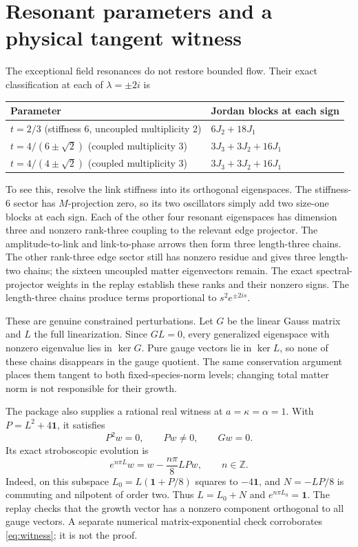 \documentclass[11pt,a4paper]{article}
\newcommand{\id}{\mathbf1}\newcommand{\dd}{\mathrm d}\newcommand{\diag}{\operatorname{diag}}
\begin{document}
\newpage
\section{Resonant parameters and a physical tangent witness}
The exceptional field resonances do not restore bounded flow. Their exact classification at each of $\lambda=\pm2i$ is
\begin{center}
\begin{tabular}{p{72mm}l}
\toprule
Parameter & Jordan blocks at each sign\\\midrule
$t=2/3$ (stiffness $6$, uncoupled multiplicity 2)&$6J_2+18J_1$\\
$t=4/(6\pm\sqrt2)$ (coupled multiplicity 3)&$3J_3+3J_2+16J_1$\\
$t=4/(4\pm\sqrt2)$ (coupled multiplicity 3)&$3J_3+3J_2+16J_1$\\\bottomrule
\end{tabular}
\end{center}
To see this, resolve the link stiffness into its orthogonal eigenspaces. The stiffness-$6$ sector has $M$-projection zero, so its two oscillators simply add two size-one blocks at each sign. Each of the other four resonant eigenspaces has dimension three and nonzero rank-three coupling to the relevant edge projector. The amplitude-to-link and link-to-phase arrows then form three length-three chains. The other rank-three edge sector still has nonzero residue and gives three length-two chains; the sixteen uncoupled matter eigenvectors remain. The exact spectral-projector weights in the replay establish these ranks and their nonzero signs. The length-three chains produce terms proportional to $s^2e^{\pm2is}$.

These are genuine constrained perturbations. Let $G$ be the linear Gauss matrix and $L$ the full linearization. Since $GL=0$, every generalized eigenspace with nonzero eigenvalue lies in $\ker G$. Pure gauge vectors lie in $\ker L$, so none of these chains disappears in the gauge quotient. The same conservation argument places them tangent to both fixed-species-norm levels; changing total matter norm is not responsible for their growth.

The package also supplies a rational real witness at $a=\kappa=\alpha=1$. With $P=L^2+4\id$, it satisfies
\[
P^2w=0,\qquad Pw\ne0,\qquad Gw=0.
\]
Its exact stroboscopic evolution is
\begin{equation}
e^{n\pi L}w=w-\frac{n\pi}{8}LPw,\qquad n\in\mathbb Z.\label{eq:witness}
\end{equation}
Indeed, on this subspace $L_0=L(\id+P/8)$ squares to $-4\id$, and $N=-LP/8$ is commuting and nilpotent of order two. Thus $L=L_0+N$ and $e^{n\pi L_0}=\id$. The replay checks that the growth vector has a nonzero component orthogonal to all gauge vectors. A separate numerical matrix-exponential check corroborates \eqref{eq:witness}; it is not the proof.
\end{document}
